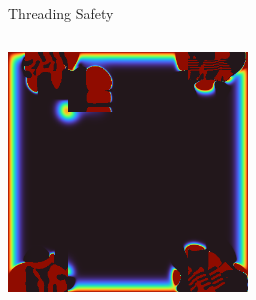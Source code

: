 \begin{frame}{Threading Safety}
\begin{columns}
\begin{center}
  \vspace{0.1cm}

  \includegraphics[width=0.6\textwidth]{glitch_04.png}
  \end{center}
\end{columns}
\end{frame}
\placelogotrue
